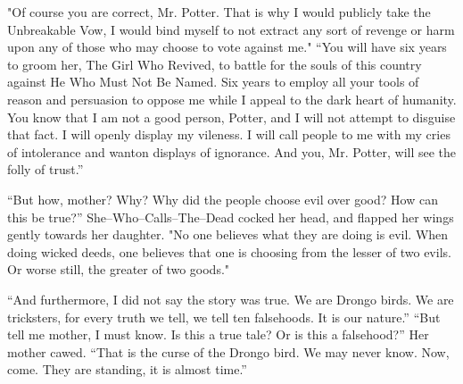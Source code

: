 "Of course you are correct, Mr. Potter. That is why I would publicly take the Unbreakable Vow, I would bind myself to not extract any sort of revenge or harm upon any of those who may choose to vote against me."
\SomeVSpace
“You will have six years to groom her, The Girl Who Revived, to battle for the souls of this country against He Who Must Not Be Named. Six years to employ all your tools of reason and persuasion to oppose me while I appeal to the dark heart of humanity. You know that I am not a good person, Potter, and I will not attempt to disguise that fact. I will openly display my vileness. I will call people to me with my cries of intolerance and wanton displays of ignorance. And you, Mr. Potter, will see the folly of trust.”
\simpleline
{}

“But how, mother? Why? Why did the people choose evil over good? How can this be true?”
\SmallVSpace
She\mbox{--}Who\mbox{--}Calls\mbox{--}The\mbox{--}Dead cocked her head, and flapped her wings gently towards her daughter. "No one believes what they are doing is evil. When doing wicked deeds, one believes that one is choosing from the lesser of two evils. Or worse still, the greater of two goods."

“And furthermore, I did not say the story was true. We are Drongo birds. We are tricksters, for every truth we tell, we tell ten falsehoods. It is our nature.”
\SmallVSpace
“But tell me mother, I must know. Is this a true tale? Or is this a falsehood?”
\SmallVSpace
Her mother cawed. “That is the curse of the Drongo bird. We may never know. Now, come. They are standing, it is almost time.”